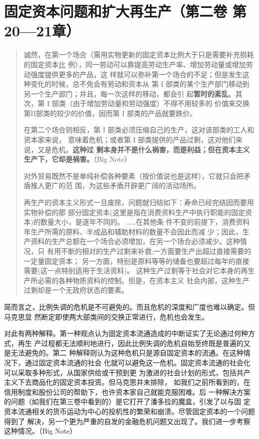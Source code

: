 \chapter{固定资本问题和扩大再生产（第二卷 第20—21章）}

\begin{quotation}

  诚然，在第一个场合（需用实物更新的固定资本比例大于只是需要补充损耗的固定资本比
  例），同一劳动可以靠提高劳动生产率、增加劳动量或增加劳动强度提供更多的产品，这
  样就可以弥补第一个场合的不足；但是发生这种变化的时候，总不免会有劳动和资本从
  第 I 部类的某个生产部门移动到另一个生产部门；并且，每一次这样的移动，都会引
  起\textbf{暂时的紊乱}。其次，第 I 部类（由于增加劳动量和劳动强度）不得不用较多的
  价值来交换第II部类的较少的价值，因而第 I 部类的产品就要跌价。

  在第二个场合则相反，第 I 部类必须压缩自己的生产，这对该部类的工人和资本家来说，
  意味着危机；或者第 I 部类提供的产品过剩，这对他们来说，又是危机。\textbf{这种过
    剩本身并不是什么祸害，而是利益；但在资本主义生产下，它却是祸害。}（Big Note）

  对外贸易既然不是单纯补偿各种要素（按价值说也是这样），它就只会把矛盾推人更广的范
  围，为这些矛盾开辟更广阔的活动场所。

  再生产的资本主义形式一旦废除，问题就归结如下：寿命已经完结因而要用实物补偿的那
  部分固定资本(这里是指在消费资料生产中执行职能的固定资本)的数量大小，是逐年不同的。
  ……在其他条
  件不变的前提下，消费资料年生产所需的原料、半成品和辅助材料的数量不会因此而减
  少；因此，生产资料的生产总额在一个场合必须增加，在另一个场合必须减少。这种情况，只
  有用不断的相对的生产过剩来补救;一方面要生产出超过直接需要的一定量固定资本；
  另一方面，特别是原料等等的储备也要超过每年的直接需要(这一点特别适用于生活资料)。
  这种生产过剩等于社会对它本身的再生产所必需的各种物质资料的控制。但是，在资本主义
  社会内部，这种生产过剩却是一个无政府状态的要素。 

\end{quotation}

简而言之，比例失调的危机是不可避免的。而且危机的深度和广度也难以确定。但马克思显
然断定即使两大部类间的交换正常进行，危机也会发生。

对此有两种解释。第一种观点认为固定资本流通造成的中断证实了无论通过何种方式，再生
产过程都无法顺利地进行，因此比例失调的危机自始至终既是普遍的又是无法避免的。第二
种解释则认为这种危机只是源自固定资本的流通。在这种情况下，通过固定资本流通的社会
化就可以避免这一危机。固定资本流通的社会化可以采取多种形式，从国家供给或干预到更
为激进的社会计划的形式，包括共产主义下去商品化的固定资本投资。但马克思并未排除，
如我们之前所看到的，在信用制度和股份公司的帮助下，也许资本家自己就能克服困难。后
一种解决方案的问题（如我们在第三卷中看到的）是它打开了潘多拉的魔盒，引发了以与固
定资本流通相关的货币运动为中心的投机性的繁荣和崩溃。尽管固定资本的一个问题得到了
解决，另一个更为严重的自发的金融危机问题又出现了。我们进一步考察这种情况。（Big Note）

